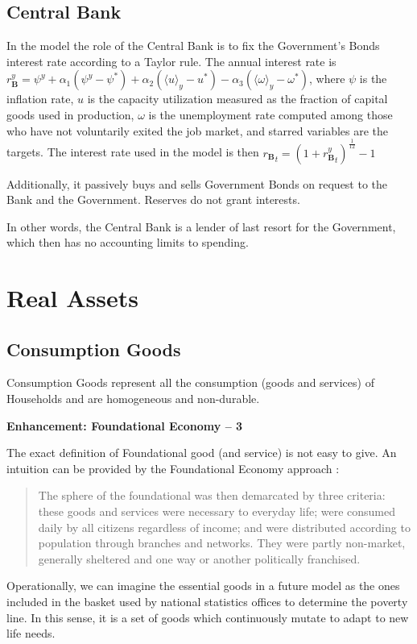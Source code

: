 \documentclass[a4paper, headings=standardclasses]{scrartcl}
\newenvironment{enh}[1][]{\begin{framed}\noindent\textbf{Enhancement: #1}\par}{\end{framed}}
\begin{document}
\subsection{Central Bank}
In the model the role of the Central Bank is to fix the Government's Bonds interest rate according to a Taylor rule.
The annual interest rate is ${r_\mathbf{B}^y} = \psi^y + \alpha_1 (\psi^y - \psi^*) + \alpha_2 (\langle u \rangle_y - u^*) - \alpha_3 (\langle \omega \rangle_y - \omega^*)$, where $\psi$ is the inflation rate, $u$ is the capacity utilization measured as the fraction of capital goods used in production, $\omega$ is the unemployment rate computed among those who have not voluntarily exited the job market, and starred variables are the targets. The interest rate used in the model is then ${r_\mathbf{B}}_t = (1 + {r_\mathbf{B}^y}_t)^{\frac{1}{12}} - 1$


Additionally, it passively buys and sells Government Bonds on request to the Bank and the Government. Reserves do not grant interests.

In other words, the Central Bank is a lender of last resort for the Government, which then has no accounting limits to spending.

\section{Real Assets}
\subsection{Consumption Goods}
Consumption Goods represent all the consumption (goods and services) of Households and are homogeneous and non-durable.

\begin{enh}[Foundational Economy -- 3]
    The exact definition of Foundational good (and service) is not easy to give. An intuition can be provided by the Foundational Economy approach \parencite{arcidiacono2018}: \begin{quote}
        The sphere of the foundational was then demarcated by three criteria: these goods and services were necessary to everyday life; were consumed daily by all citizens regardless of income; and were distributed according to population through branches and networks. They were partly non-market, generally sheltered and one way or another politically franchised.
    \end{quote}

    Operationally, we can imagine the essential goods in a future model as the ones included in the basket used by national statistics offices to determine the poverty line. In this sense, it is a set of goods which continuously mutate to adapt to new life needs.
\end{enh}
\end{document}
